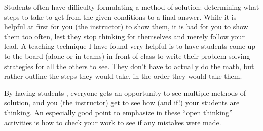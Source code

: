 \vskip 10pt

Students often have difficulty formulating a method of solution: determining what steps to take to get from the given conditions to a final answer.  While it is helpful at first for you (the instructor) to show them, it is bad for you to show them too often, lest they stop thinking for themselves and merely follow your lead.  A teaching technique I have found very helpful is to have students come up to the board (alone or in teams) in front of class to write their problem-solving strategies for all the others to see.  They don't have to actually do the math, but rather outline the steps they would take, in the order they would take them.

By having students , everyone gets an opportunity to see multiple methods of solution, and you (the instructor) get to see how (and if!) your students are thinking.  An especially good point to emphasize in these ``open thinking'' activities is how to check your work to see if any mistakes were made.





